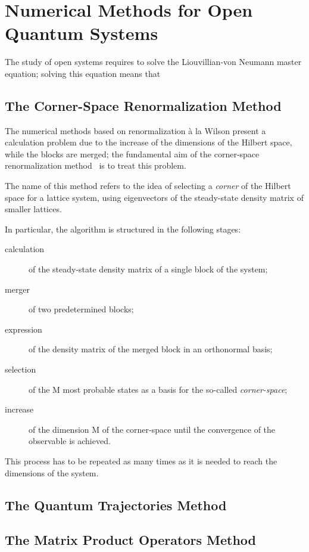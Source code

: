 \chapter{Numerical Methods for Open Quantum Systems}
The study of open systems requires to solve the Liouvillian-von Neumann master equation; solving this equation means that 

\section{The Corner-Space Renormalization Method}
The numerical methods based on renormalization à la Wilson present a calculation problem due to the increase of the dimensions of the Hilbert space, while the blocks are merged; the fundamental aim of the corner-space renormalization method~\cite{PhysRevLett.115.080604} is to treat this problem.

The name of this method refers to the idea of selecting a \emph{corner} of the Hilbert space for a lattice system, using eigenvectors of the steady-state density matrix of smaller lattices.

In particular, the algorithm is structured in the following stages:
\begin{description}
    \item[calculation] of the steady-state density matrix of a single block of the system;
    \item[merger] of two predetermined blocks;
    \item[expression] of the density matrix of the merged block in an orthonormal basis;
    \item[selection] of the M most probable states as a basis for the so-called \emph{corner-space};
    \item[increase] of the dimension M of the corner-space until the convergence of the observable is achieved.
\end{description}

This process has to be repeated as many times as it is needed to reach the dimensions of the system.


\section{The Quantum Trajectories Method}

\section{The Matrix Product Operators Method}
